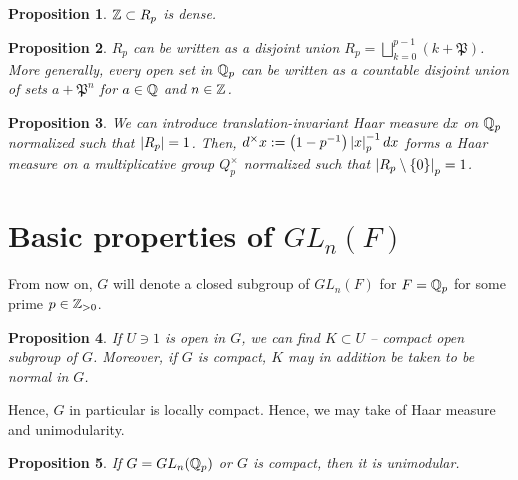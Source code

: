 \documentclass[pdf,notes]{beamer}
\theoremstyle{mystyle}
\newtheorem{prop}{Proposition}
\begin{document}
\begin{frame}
	\begin{prop}
		$\mathbb{Z}\subset R_p$ is dense.
		\label{}
	\end{prop}
	\begin{prop}
		$R_p$ can be written as a disjoint union $R_p=\bigsqcup_{k=0}^{p-1}\left( k+\mathfrak{P} \right)$. More generally,
		every open set in $\mathbb{Q}_p$ can be written as a countable disjoint union of sets $a+\mathfrak{P}^n$ for $a\in\mathbb{Q}$
		and $n\in\mathbb{Z}$.
	\end{prop}
\end{frame}
\begin{frame}
	\begin{prop}
		We can introduce translation-invariant Haar measure $dx$ on $\mathbb{Q}_p$ normalized such that $\left|R_p\right|=1$.
		Then, $d^{\times}x:=\left( 1-p^{-1} \right)\left|x\right|_p^{-1}dx$ forms a Haar measure on a multiplicative group
		$Q_p^{\times}$ normalized such that $\left|R_p\setminus\left\{ 0 \right\}\right|_p=1$.
	\end{prop}
\end{frame}
\section{Basic properties of $GL_n(F)$}
\begin{frame}
	From now on, $G$ will denote a closed subgroup of $GL_n(F)$ for $F=\mathbb{Q}_p$ for some prime $p\in\mathbb{Z}_{>0}$.
	\begin{prop}
		If $U\ni1$ is open in $G$, we can find $K\subset U$ -- compact open subgroup of $G$. Moreover, if $G$ is compact,
		$K$ may in addition be taken to be normal in $G$.
	\end{prop}
	Hence, $G$ in particular is locally compact. Hence, we may take of Haar measure and unimodularity.
	\begin{prop}
		If $G=GL_n(\mathbb{Q}_p)$ or $G$ is compact, then it is unimodular.
	\end{prop}
\end{frame}
\end{document}
